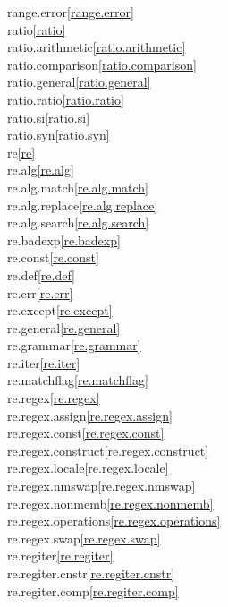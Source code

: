 \begin{multicols}{2}
range.error\quad\ref{range.error}\\
ratio\quad\ref{ratio}\\
ratio.arithmetic\quad\ref{ratio.arithmetic}\\
ratio.comparison\quad\ref{ratio.comparison}\\
ratio.general\quad\ref{ratio.general}\\
ratio.ratio\quad\ref{ratio.ratio}\\
ratio.si\quad\ref{ratio.si}\\
ratio.syn\quad\ref{ratio.syn}\\
re\quad\ref{re}\\
re.alg\quad\ref{re.alg}\\
re.alg.match\quad\ref{re.alg.match}\\
re.alg.replace\quad\ref{re.alg.replace}\\
re.alg.search\quad\ref{re.alg.search}\\
re.badexp\quad\ref{re.badexp}\\
re.const\quad\ref{re.const}\\
re.def\quad\ref{re.def}\\
re.err\quad\ref{re.err}\\
re.except\quad\ref{re.except}\\
re.general\quad\ref{re.general}\\
re.grammar\quad\ref{re.grammar}\\
re.iter\quad\ref{re.iter}\\
re.matchflag\quad\ref{re.matchflag}\\
re.regex\quad\ref{re.regex}\\
re.regex.assign\quad\ref{re.regex.assign}\\
re.regex.const\quad\ref{re.regex.const}\\
re.regex.construct\quad\ref{re.regex.construct}\\
re.regex.locale\quad\ref{re.regex.locale}\\
re.regex.nmswap\quad\ref{re.regex.nmswap}\\
re.regex.nonmemb\quad\ref{re.regex.nonmemb}\\
re.regex.operations\quad\ref{re.regex.operations}\\
re.regex.swap\quad\ref{re.regex.swap}\\
re.regiter\quad\ref{re.regiter}\\
re.regiter.cnstr\quad\ref{re.regiter.cnstr}\\
re.regiter.comp\quad\ref{re.regiter.comp}\\

\end{multicols}

